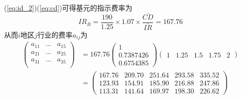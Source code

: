 \documentclass[a4paper,12pt]{ctexart}
\begin{document}
(\ref{eq:id_2})(\ref{eq:cd})可得基元的指示费率为
\begin{equation}
    IR_B=\frac{190}{1.25}\times 1.07\times \frac{\bar{CD}}{\bar{IR}}=167.76
\end{equation}
从而$i$地区$j$行业的费率$a_{ij}$为
\begin{eqnarray}
    \begin{pmatrix}
        a_{11} & \dots & a_{15} \\
        a_{21} & \dots & a_{25} \\
        a_{31} & \dots & a_{35} \\
    \end{pmatrix}&=
    167.76
    \begin{pmatrix}
        1 \\0.7387426\\0.6754385
    \end{pmatrix}
    \begin{pmatrix}
        1 & 1.25 & 1.5 & 1.75 & 2
    \end{pmatrix}\\
    & =
    \begin{pmatrix}
        167.76 & 209.70 & 251.64 & 293.58 & 335.52\\
        123.93 & 154.91 & 185.90 & 216.88 & 247.86\\
        113.31 & 141.64 & 169.97 & 198.30 & 226.62
    \end{pmatrix}
\end{eqnarray}
\end{document}
